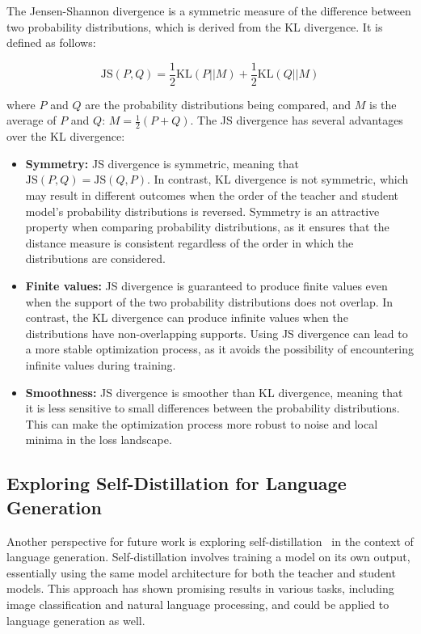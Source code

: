 \documentclass{article} %
\begin{document}
The Jensen-Shannon divergence is a symmetric measure of the difference between two probability distributions, which is derived from the KL divergence. It is defined as follows:

\begin{equation}
\text{JS}(P, Q) = \frac{1}{2} \text{KL}(P || M) + \frac{1}{2} \text{KL}(Q || M)
\end{equation}

where $P$ and $Q$ are the probability distributions being compared, and $M$ is the average of $P$ and $Q$: $M = \frac{1}{2}(P + Q)$. The JS divergence has several advantages over the KL divergence:
\begin{itemize}
    \item \textbf{Symmetry:} JS divergence is symmetric, meaning that $\text{JS}(P, Q) = \text{JS}(Q, P)$. In contrast, KL divergence is not symmetric, which may result in different outcomes when the order of the teacher and student model's probability distributions is reversed. Symmetry is an attractive property when comparing probability distributions, as it ensures that the distance measure is consistent regardless of the order in which the distributions are considered.
    \item \textbf{Finite values:} JS divergence is guaranteed to produce finite values even when the support of the two probability distributions does not overlap. In contrast, the KL divergence can produce infinite values when the distributions have non-overlapping supports. Using JS divergence can lead to a more stable optimization process, as it avoids the possibility of encountering infinite values during training.
    \item \textbf{Smoothness:} JS divergence is smoother than KL divergence, meaning that it is less sensitive to small differences between the probability distributions. This can make the optimization process more robust to noise and local minima in the loss landscape.
\end{itemize}

\subsection{Exploring Self-Distillation for Language Generation}
Another perspective for future work is exploring self-distillation~\cite{zhang2019teacher} in the context of language generation. Self-distillation involves training a model on its own output, essentially using the same model architecture for both the teacher and student models. This approach has shown promising results in various tasks, including image classification and natural language processing, and could be applied to language generation as well.
\end{document}
